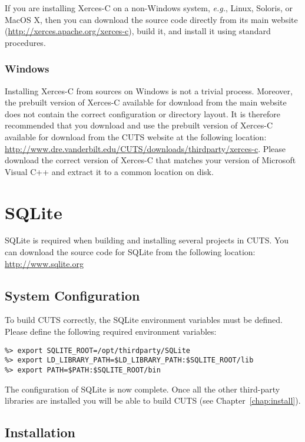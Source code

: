 If you are installing Xerces-C on a non-Windows system, \textit{e.g.}, Linux, 
Soloris, or MacOS X, then you can download the source code directly from its
main website (\url{http://xerces.apache.org/xerces-c}), build it, and install it using 
standard procedures.

\subsubsection{Windows}

Installing Xerces-C from sources on Windows is not a trivial process. 
Moreover, the prebuilt version of Xerces-C available for download from 
the main website does not contain the correct configuration or directory
layout. It is therefore recommended that you download and use the prebuilt 
version of Xerces-C available for download from the CUTS website at the 
following location:
\url{http://www.dre.vanderbilt.edu/CUTS/downloads/thirdparty/xerces-c}. Please download
the correct version of Xerces-C that matches your version of Microsoft Visual
C++ and extract it to a common location on disk.

\section{SQLite}
\label{sec:thirdparty-sqlite}

SQLite is required when building and installing several 
projects in CUTS. You can download the source code for SQLite
from the following location: \url{http://www.sqlite.org}

\subsection{System Configuration}

To build CUTS correctly, the SQLite environment variables must be defined. Please 
define the following required environment variables:
\begin{lstlisting}
%> export SQLITE_ROOT=/opt/thirdparty/SQLite
%> export LD_LIBRARY_PATH=$LD_LIBRARY_PATH:$SQLITE_ROOT/lib
%> export PATH=$PATH:$SQLITE_ROOT/bin
\end{lstlisting}
The configuration of SQLite is now complete. Once all the other
third-party libraries are installed you will be able to build CUTS
(see Chapter~\ref{chap:install}).

\subsection{Installation}

